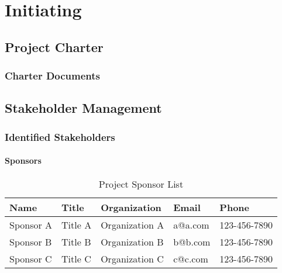 \documentclass[12pt,letterpaper]{report}
\date{Revision Date: \today}
\author{Program Manager: Frank Pereny}
\title
{
	\Huge{\textbf{Project Management Plan}} \\
	\textbf{\projectname} \\ 
	\subtitle
}
\begin{document}
	\maketitle
	\tableofcontents
	
	\part{Initiating}
	\chapter{Project Charter}
	\section{Charter Documents}
	
	
\chapter{Stakeholder Management}
	\section{Identified Stakeholders}
		\subsection{Sponsors}
			\begin{table}[!htbp]
				\small
				\begin{tabularx}{\textwidth}{|X|X|X|X|l|}
					\hline
					\textbf{Name} & \textbf{Title} & \textbf{Organization} & \textbf{Email} & \textbf{Phone} \\ \hline
					Sponsor A     & Title A        & Organization A        & a@a.com        & 123-456-7890   \\ \hline
					Sponsor B     & Title B        & Organization B        & b@b.com        & 123-456-7890   \\ \hline
					Sponsor C     & Title C        & Organization C        & c@c.com        & 123-456-7890   \\ \hline
				\end{tabularx}
				\caption{Project Sponsor List}
			\end{table}
			\normalfont
\end{document}
